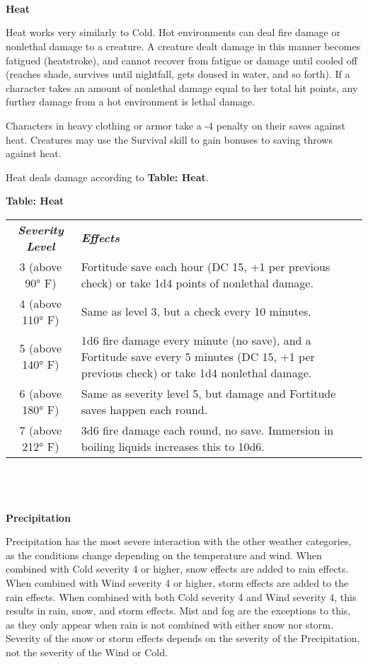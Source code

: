 {{\begin{tabularx}{\columnwidth}{c>{\centering}X}
		\end{tabularx}}\\\\\\
	{\large\textbf{Heat}}\\\par
	Heat works very similarly to Cold. Hot environments can deal fire damage or nonlethal damage to a creature. A creature dealt damage in this manner becomes fatigued (heatstroke), and cannot recover from fatigue or damage until cooled off (reaches shade, survives until nightfall, gets doused in water, and so forth). If a character takes an amount of nonlethal damage equal to her total hit points, any further damage from a hot environment is lethal damage.
	\par Characters in heavy clothing or armor take a -4 penalty on their saves against heat. Creatures may use the Survival skill to gain bonuses to saving throws against heat.
	\par Heat deals damage according to \textbf{Table: Heat}.\columnbreak\\
	{\textbf{Table: Heat}\small\\
		\begin{tabularx}{\columnwidth}{c>{\centering}X}
			\rowcolor{gray!50}
			\textbf{\textit{Severity Level}} &  \textbf{\textit{Effects}} \tabularnewline
			3 (above 90° F) & Fortitude save each hour (DC 15, +1 per previous check) or take 1d4 points of nonlethal damage. \tabularnewline
			4 (above 110° F) & Same as level 3, but a check every 10 minutes. \tabularnewline
			5 (above 140° F) & 1d6 fire damage every minute (no save), and a Fortitude save every 5 minutes (DC 15, +1 per previous check) or take 1d4 nonlethal damage. \tabularnewline
			6 (above 180° F) & Same as severity level 5, but damage and Fortitude saves happen each round. \tabularnewline
			7 (above 212° F) & 3d6 fire damage each round, no save. Immersion in boiling liquids increases this to 10d6.
		\end{tabularx}}\\\\\\
	{\large\textbf{Precipitation}}\\\par
	Precipitation has the most severe interaction with the other weather categories, as the conditions change depending on the temperature and wind. When combined with Cold severity 4 or higher, snow effects are added to rain effects. When combined with Wind severity 4 or higher, storm effects are added to the rain effects. When combined with both Cold severity 4 and Wind severity 4, this results in rain, snow, and storm effects. Mist and fog are the exceptions to this, as they only appear when rain is not combined with either snow nor storm. Severity of the snow or storm effects depends on the severity of the Precipitation, not the severity of the Wind or Cold.\\\\
}
